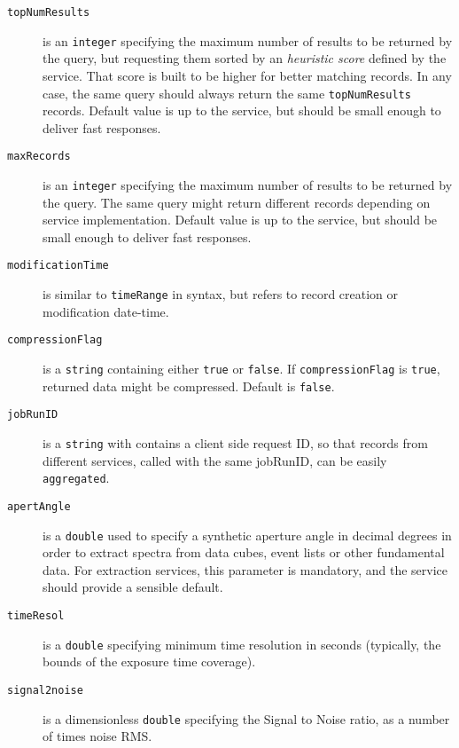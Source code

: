 \begin{description}
		\item[\texttt{topNumResults}] is an \texttt{integer}
        specifying the maximum number of results to be returned by
        the query, but requesting them sorted by an \emph{heuristic
        score} defined by the service. That score is built to be
        higher for better matching records. In any case, the same
        query should always return the same \texttt{topNumResults}
        records. Default value is up to the service, but should be
        small enough to deliver fast responses.
		
		\item[\texttt{maxRecords}] is an \texttt{integer} 
		specifying the maximum number of results to be returned by 
		the query. The same query might return different records 
		depending on service implementation. Default value is up 
		to the service, but should be small enough to deliver fast 
		responses.
		
		\item[\texttt{modificationTime}] is similar to 
		\texttt{timeRange} in syntax, but refers to record 
		creation or modification date-time.
		
		\item[\texttt{compressionFlag}] is a \texttt{string} 
		containing either \texttt{true} or \texttt{false}. If 
		\texttt{compressionFlag} is \texttt{true}, returned 
		data might be compressed. Default is \texttt{false}.
		
		\item[\texttt{jobRunID}] is a \texttt{string} with 
		contains a client side request ID, so that records from 
		different services, called with the same jobRunID, can 
		be easily \texttt{aggregated}.
		
		\item[\texttt{apertAngle}] is a \texttt{double} used to
		specify a synthetic aperture angle in decimal degrees in
		order to extract spectra from data cubes, event lists or 
		other fundamental data. For extraction services, this 
		parameter is mandatory, and the service should provide a
		sensible default.
		
		\item[\texttt{timeResol}] is a \texttt{double} specifying
        minimum time resolution in seconds (typically, the bounds of
        the exposure time coverage).
		
		\item[\texttt{signal2noise}] is a dimensionless
        \texttt{double} specifying the Signal to Noise ratio, as a
        number of times noise RMS.
					

\end{description}
